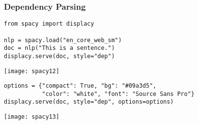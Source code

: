 \begin{frame}[fragile]\frametitle{Dependency Parsing}

\begin{lstlisting}
from spacy import displacy

nlp = spacy.load("en_core_web_sm")
doc = nlp("This is a sentence.")
displacy.serve(doc, style="dep")
\end{lstlisting}

\begin{center}
\texttt{[image: spacy12]}
\end{center}

\begin{lstlisting}
options = {"compact": True, "bg": "#09a3d5",
           "color": "white", "font": "Source Sans Pro"}
displacy.serve(doc, style="dep", options=options)
\end{lstlisting}

\begin{center}
\texttt{[image: spacy13]}
\end{center}

\end{frame}
